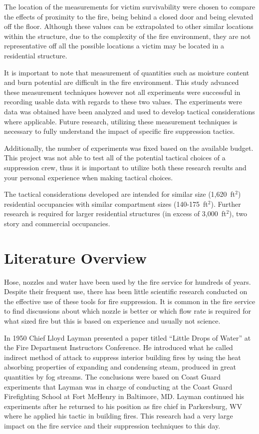 \documentclass[12pt,oneside]{book}
\begin{document}
The location of the measurements for victim survivability were chosen to compare the effects of proximity to the fire, being behind a closed door and being elevated off the floor. Although these values can be extrapolated to other similar locations within the structure, due to the complexity of the fire environment, they are not representative off all the possible locations a victim may be located in a residential structure.  

It is important to note that measurement of quantities such as moisture content and burn potential are difficult in the fire environment. This study advanced these measurement techniques however not all experiments were successful in recording usable data with regards to these two values. The experiments were data was obtained have been analyzed and used to develop tactical considerations where applicable. Future research, utilizing these measurement techniques is necessary to fully understand the impact of specific fire suppression tactics. 

Additionally, the number of experiments was fixed based on the available budget. This project was not able to test all of the potential tactical choices of a suppression crew, thus it is important to utilize both these research results and your personal experience when making tactical choices.  

The tactical considerations developed are intended for similar size (1,620~ft$^2$) residential occupancies with similar compartment sizes (140-175~ft$^2$). Further research is required for larger residential structures (in excess of 3,000~ft$^2$), two story and commercial occupancies.

\clearpage

\chapter{Literature Overview}

Hose, nozzles and water have been used by the fire service for hundreds of years. Despite their frequent use, there has been little scientific research conducted on the effective use of these tools for fire suppression. It is common in the fire service to find discussions about which nozzle is better or which flow rate is required for what sized fire but this is based on experience and usually not science. 

In 1950 Chief Lloyd Layman presented a paper titled “Little Drops of Water” at the Fire Department Instructors Conference. He introduced what he called indirect method of attack to suppress interior building fires by using the heat absorbing properties of expanding and condensing steam, produced in great quantities by fog streams. The conclusions were based on Coast Guard experiments that Layman was in charge of conducting at the Coast Guard Firefighting School at Fort McHenry in Baltimore, MD. Layman continued his experiments after he returned to his position as fire chief in Parkersburg, WV where he applied his tactic in building fires.  This research had a very large impact on the fire service and their suppression techniques to this day. 
\end{document}
